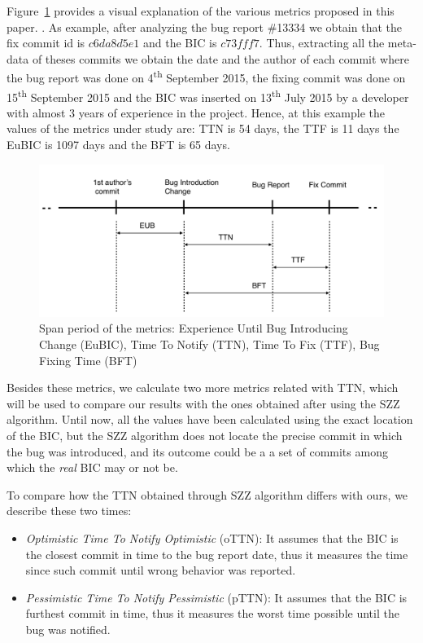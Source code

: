 \documentclass[10pt, conference]{IEEEtran}
\begin{document}
Figure~\ref{fig:metrics} provides a visual explanation of the various metrics proposed in this paper. . As example, after analyzing the bug report \#13334 we obtain that the fix commit id is $c6da8d5e1$ and the BIC is $c73fff7$. Thus, extracting all the meta-data of theses commits we obtain the date and the author of each commit where the bug report was done on 4\textsuperscript{th} September 2015, the fixing commit was done on 15\textsuperscript{th} September 2015 and the BIC was inserted on 13\textsuperscript{th} July 2015 by a developer with almost 3 years of experience in the project. Hence, at this example the values of the metrics under study are:  TTN is 54 days, the TTF is 11 days the EuBIC is 1097 days and the BFT is 65 days.
\begin{figure}[ht]
\centering
\includegraphics[width=\columnwidth]{metrics.png}
\caption{ Span period of the metrics: Experience Until Bug Introducing Change (EuBIC),  Time To Notify (TTN), Time To Fix (TTF), Bug Fixing Time (BFT) }
\label{fig:metrics}       %
\end{figure}

Besides these metrics, we calculate two more metrics related with TTN, which will be used to compare our results with the ones obtained after using the SZZ algorithm. Until now, all the values have been calculated using the exact location of the BIC, but the SZZ algorithm does not locate the precise commit in which the bug was introduced, and its outcome could be a a set of commits among which the \emph{real} BIC may or not be. 

To compare how the TTN obtained through SZZ algorithm differs with ours, we describe these two times:
\begin{itemize}
	\item \emph{Optimistic Time To Notify Optimistic} (oTTN): It assumes that the BIC is the closest commit in time to the bug report date, thus it measures the time since such commit until wrong behavior was reported.
	\item \emph{Pessimistic Time To Notify Pessimistic} (pTTN): It assumes that the BIC is furthest commit in time, thus it measures the worst time possible until the bug was notified.
\end{itemize}
\end{document}
